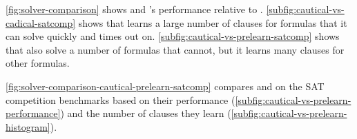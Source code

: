 \autoref{fig:solver-comparison} shows \tool and \cadical's performance relative
to \cadical.
\autoref{subfig:cautical-vs-cadical-satcomp} shows that \tool learns a large number of
\pr clauses for formulas that it can solve quickly and \cadical times out on.
\autoref{subfig:cautical-vs-prelearn-satcomp} shows that \prelearn also solve a number
of formulas that \tool cannot, but it learns many \pr clauses for
other formulas.

\autoref{fig:solver-comparison-cautical-prelearn-satcomp} compares \tool and \prelearn on the SAT
competition benchmarks based on their performance (\autoref{subfig:cautical-vs-prelearn-performance}) 
and the number of \pr clauses they learn (\autoref{subfig:cautical-vs-prelearn-histogram}).












